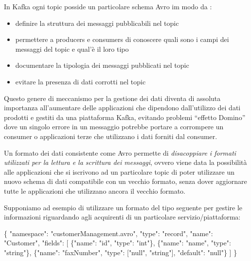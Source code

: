 \documentclass[]{article}
\newenvironment{Shaded}{}{}
\newcommand{\DataTypeTok}[1]{\textcolor[rgb]{0.56,0.13,0.00}{#1}}
\newcommand{\StringTok}[1]{\textcolor[rgb]{0.25,0.44,0.63}{#1}}
\newcommand{\OtherTok}[1]{\textcolor[rgb]{0.00,0.44,0.13}{#1}}
\newcommand{\FunctionTok}[1]{\textcolor[rgb]{0.02,0.16,0.49}{#1}}
\providecommand{\tightlist}{%
  \setlength{\itemsep}{0pt}\setlength{\parskip}{0pt}}
\begin{document}
\normalsize

In Kafka ogni topic posside un particolare schema Avro im modo da :

\begin{itemize}
\tightlist
\item
  definire la struttura dei messaggi pubblicabili nel topic
\item
  permettere a producers e consumers di conoscere quali sono i campi dei
  messaggi del topic e qual'è il loro tipo
\item
  documentare la tipologia dei messaggi pubblicati nel topic
\item
  evitare la presenza di dati corrotti nel topic
\end{itemize}

Questo genere di meccanismo per la gestione dei dati diventa di assoluta
importanza all'aumentare delle applicazioni che dipendono dall'utilizzo
dei dati prodotti e gestiti da una piattaforma Kafka, evitando problemi
``effetto Domino'' dove un singolo errore in un messaggio potrebbe
portare a corrompere un consumer o applicazioni terze che utilizzano i
dati forniti dal consumer.

Un formato dei dati consistente come Avro permette di \emph{disacoppiare
i formati utilizzati per la lettura e la scrittura dei messaggi}, ovvero
viene data la possibilità alle applicazioni che si iscrivono ad un
particolare topic di poter utilizzare un nuovo schema di dati
compatibile con un vecchio formato, senza dover aggiornare tutte le
applicazioni che utilizzano ancora il vecchio formato.

Supponiamo ad esempio di utilizzare un formato del tipo seguente per
gestire le informazioni riguardando agli acquirenti di un particolare
servizio/piattaforma:

\small 

\begin{Shaded}
\begin{Highlighting}[]
\FunctionTok{\{}
    \DataTypeTok{"namespace"}\FunctionTok{:} \StringTok{"customerManagement.avro"}\FunctionTok{,}
    \DataTypeTok{"type"}\FunctionTok{:} \StringTok{"record"}\FunctionTok{,}
    \DataTypeTok{"name"}\FunctionTok{:} \StringTok{"Customer"}\FunctionTok{,}
    \DataTypeTok{"fields"}\FunctionTok{:} \OtherTok{[}
         \FunctionTok{\{}\DataTypeTok{"name"}\FunctionTok{:} \StringTok{"id"}\FunctionTok{,} \DataTypeTok{"type"}\FunctionTok{:} \StringTok{"int"}\FunctionTok{\}}\OtherTok{,}
         \FunctionTok{\{}\DataTypeTok{"name"}\FunctionTok{:} \StringTok{"name"}\FunctionTok{,}  \DataTypeTok{"type"}\FunctionTok{:} \StringTok{"string"}\FunctionTok{\}}\OtherTok{,}
         \FunctionTok{\{}\DataTypeTok{"name"}\FunctionTok{:} \StringTok{"faxNumber"}\FunctionTok{,} \DataTypeTok{"type"}\FunctionTok{:} \OtherTok{[}\StringTok{"null"}\OtherTok{,} \StringTok{"string"}\OtherTok{]}\FunctionTok{,} \DataTypeTok{"default"}\FunctionTok{:} \StringTok{"null"}\FunctionTok{\}}
    \OtherTok{]} 
\FunctionTok{\}}
\end{Highlighting}
\end{Shaded}
\end{document}
